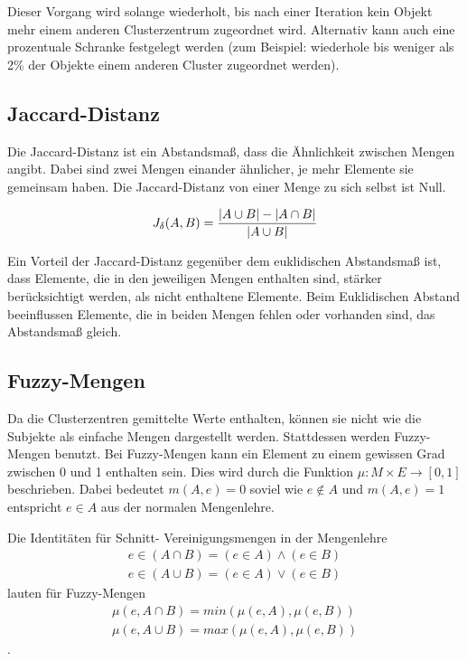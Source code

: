 \documentclass[a4paper]{llncs}
\begin{document}
Dieser Vorgang wird solange wiederholt, bis nach einer Iteration kein Objekt mehr einem anderen Clusterzentrum zugeordnet wird. Alternativ kann auch eine prozentuale Schranke festgelegt werden (zum Beispiel: wiederhole bis weniger als 2\% der Objekte einem anderen Cluster zugeordnet werden).

\subsection{Jaccard-Distanz}
Die Jaccard-Distanz ist ein Abstandsmaß, dass die Ähnlichkeit zwischen Mengen angibt. Dabei sind zwei Mengen einander ähnlicher, je mehr Elemente sie gemeinsam haben. Die Jaccard-Distanz von einer Menge zu sich selbst ist Null.


$$J_{\delta}(A,B) = %
{ { |A \cup B| - |A \cap B| } \over |A \cup B| }$$

Ein Vorteil der Jaccard-Distanz gegenüber dem euklidischen Abstandsmaß ist, dass Elemente, die in den jeweiligen Mengen enthalten sind, stärker berücksichtigt werden, als nicht enthaltene Elemente. Beim Euklidischen Abstand beeinflussen Elemente, die in beiden Mengen fehlen oder vorhanden sind, das Abstandsmaß gleich.

\subsection{Fuzzy-Mengen}
Da die Clusterzentren gemittelte Werte enthalten, können sie nicht wie die Subjekte als einfache Mengen dargestellt werden.
Stattdessen werden Fuzzy-Mengen benutzt. Bei Fuzzy-Mengen kann ein Element zu einem gewissen Grad zwischen 0 und 1 enthalten sein.
Dies wird durch die Funktion $\mu : M \times E \rightarrow [0,1] $ beschrieben. Dabei bedeutet $m(A,e) = 0$ soviel wie $ e \not\in A $ und $m(A,e) = 1$ entspricht $ e \in A $ aus der normalen Mengenlehre.

Die Identitäten für Schnitt- Vereinigungsmengen in der Mengenlehre \begin{align*}e \in (A \cap B) = (e \in A) \wedge (e \in B)
	\\ e \in (A \cup B) = (e \in A) \vee (e \in B) \end{align*} lauten für Fuzzy-Mengen  \begin{align*}\mu(e, A \cap B) = min(\mu(e, A), \mu(e, B))\\ \mu(e, A \cup B) = max(\mu(e, A), \mu(e, B))  \end{align*}.
\end{document}

